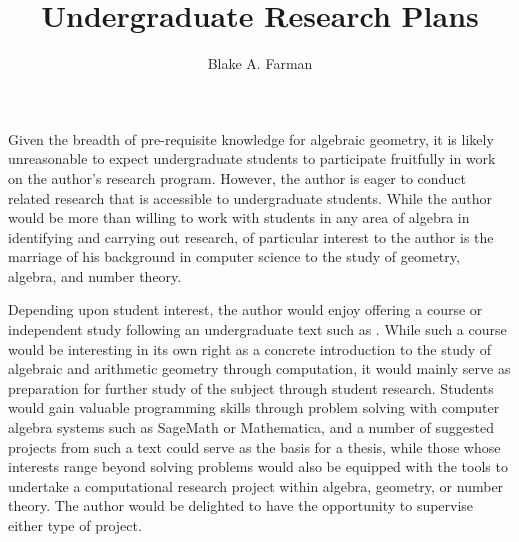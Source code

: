 \documentclass[12pt]{amsart}
\title{Undergraduate Research Plans}
\author{Blake A. Farman}
\theoremstyle{definition}
\begin{document}
\maketitle

Given the breadth of pre-requisite knowledge for algebraic geometry, it is likely unreasonable to expect undergraduate students to participate fruitfully in work on the author's research program.
However, the author is eager to conduct related research that is accessible to undergraduate students.
While the author would be more than willing to work with students in any area of algebra in identifying and carrying out research, of particular interest to the author is the marriage of his background in computer science to the study of geometry, algebra, and number theory.

Depending upon student interest, the author would enjoy offering a course or independent study following an undergraduate text such as \cite{algos}.
While such a course would be interesting in its own right as a concrete introduction to the study of algebraic and arithmetic geometry through computation, it would mainly serve as preparation for further study of the subject through student research.
Students would gain valuable programming skills through problem solving with computer algebra systems such as SageMath or Mathematica, and a number of suggested projects from such a text could serve as the basis for a thesis, while those whose interests range beyond solving problems would also be equipped with the tools to undertake a computational research project within algebra, geometry, or number theory.
The author would be delighted to have the opportunity to supervise either type of project.



\end{document}
